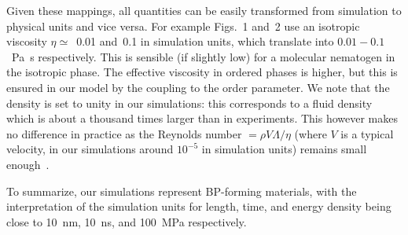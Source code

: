 \documentclass[12pt,twoside]{article}
\begin{document}
Given these mappings, all quantities can be easily transformed from
simulation to physical units and vice versa. For example Figs.~1 and~2
use an isotropic viscosity $\eta \simeq$~0.01 and~0.1 in simulation units,
which translate into $0.01-0.1$~Pa~s respectively. This is sensible (if 
slightly low) for a molecular nematogen in the isotropic phase. 
The effective viscosity in ordered phases is higher, but this is ensured
in our model by the coupling to the order parameter.
We note that the density is set to unity in our simulations: this
corresponds to a fluid density which is about a thousand times larger
than in experiments. This however makes no difference in practice as
the Reynolds number $= \rho V\Lambda/\eta$ (where $V$ is a typical
velocity, in our simulations around $10^{-5}$ in simulation units) 
remains small enough~\cite{codef}. 

To summarize, our simulations represent BP-forming materials, with the
interpretation of the simulation units for length, time, and energy
density being close to 10~nm, 10~ns, and 100~MPa respectively.



\vfill
\pagebreak
\end{document}
